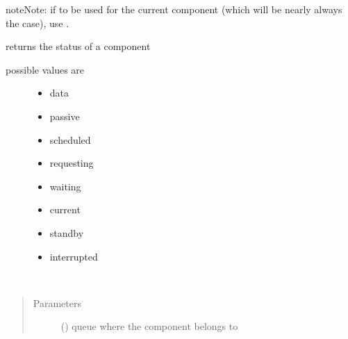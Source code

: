 \documentclass[letterpaper,10pt,english]{sphinxmanual}
\begin{document}
\begin{fulllineitems}
\begin{fulllineitems}
\begin{sphinxadmonition}{note}{Note:}
if to be used for the current component
(which will be nearly always the case),
use .
\end{sphinxadmonition}

\end{fulllineitems}


\begin{fulllineitems}
\label{\detokenize{Reference:salabim.Component.status}}
returns the status of a component
\begin{description}
\item[{possible values are}] \leavevmode\begin{itemize}
\item {} 
data

\item {} 
passive

\item {} 
scheduled

\item {} 
requesting

\item {} 
waiting

\item {} 
current

\item {} 
standby

\item {} 
interrupted

\end{itemize}

\end{description}

\end{fulllineitems}


\begin{fulllineitems}
\label{\detokenize{Reference:salabim.Component.successor}}~\begin{quote}\begin{description}
\item[{Parameters}] \leavevmode
{} ({\hyperref[\detokenize{Reference:salabim.Queue}]{}}) \textendash{} queue where the component belongs to


\end{description}
\end{quote}
\end{fulllineitems}
\end{fulllineitems}
\end{document}
